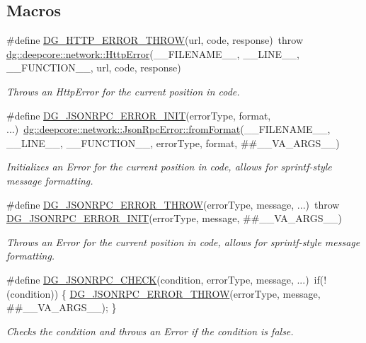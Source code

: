 \subsection*{Macros}
\begin{DoxyCompactItemize}
\item 
\#define \hyperlink{group___network_module_gaa6c6ffb478681996c90ec197922be05f}{D\+G\+\_\+\+H\+T\+T\+P\+\_\+\+E\+R\+R\+O\+R\+\_\+\+T\+H\+R\+OW}(url,  code,  response)~throw \hyperlink{classdg_1_1deepcore_1_1network_1_1_http_error}{dg\+::deepcore\+::network\+::\+Http\+Error}(\+\_\+\+\_\+\+F\+I\+L\+E\+N\+A\+M\+E\+\_\+\+\_\+, \+\_\+\+\_\+\+L\+I\+N\+E\+\_\+\+\_\+, \+\_\+\+\_\+\+F\+U\+N\+C\+T\+I\+O\+N\+\_\+\+\_\+, url, code, response)
\begin{DoxyCompactList}\small\item\em Throws an Http\+Error for the current position in code. \end{DoxyCompactList}\item 
\#define \hyperlink{group___network_module_gaedbbda4a9f7172a69859c7cce370f8a9}{D\+G\+\_\+\+J\+S\+O\+N\+R\+P\+C\+\_\+\+E\+R\+R\+O\+R\+\_\+\+I\+N\+IT}(error\+Type,  format, ...)~\hyperlink{group___network_module_ga2fdfe2154c20e91cb5f0205ced658714}{dg\+::deepcore\+::network\+::\+Json\+Rpc\+Error\+::from\+Format}(\+\_\+\+\_\+\+F\+I\+L\+E\+N\+A\+M\+E\+\_\+\+\_\+, \+\_\+\+\_\+\+L\+I\+N\+E\+\_\+\+\_\+, \+\_\+\+\_\+\+F\+U\+N\+C\+T\+I\+O\+N\+\_\+\+\_\+, error\+Type, format, \#\#\+\_\+\+\_\+\+V\+A\+\_\+\+A\+R\+G\+S\+\_\+\+\_\+)
\begin{DoxyCompactList}\small\item\em Initializes an Error for the current position in code, allows for sprintf-\/style message formatting. \end{DoxyCompactList}\item 
\#define \hyperlink{group___network_module_ga4fd4a19ca3579b636b43aaefc2877229}{D\+G\+\_\+\+J\+S\+O\+N\+R\+P\+C\+\_\+\+E\+R\+R\+O\+R\+\_\+\+T\+H\+R\+OW}(error\+Type,  message, ...)~throw \hyperlink{group___network_module_gaedbbda4a9f7172a69859c7cce370f8a9}{D\+G\+\_\+\+J\+S\+O\+N\+R\+P\+C\+\_\+\+E\+R\+R\+O\+R\+\_\+\+I\+N\+IT}(error\+Type, message, \#\#\+\_\+\+\_\+\+V\+A\+\_\+\+A\+R\+G\+S\+\_\+\+\_\+)
\begin{DoxyCompactList}\small\item\em Throws an Error for the current position in code, allows for sprintf-\/style message formatting. \end{DoxyCompactList}\item 
\#define \hyperlink{group___network_module_ga7d14a793969bb086eb3df0a4e2296db0}{D\+G\+\_\+\+J\+S\+O\+N\+R\+P\+C\+\_\+\+C\+H\+E\+CK}(condition,  error\+Type,  message, ...)~if(!(condition)) \{ \hyperlink{group___network_module_ga4fd4a19ca3579b636b43aaefc2877229}{D\+G\+\_\+\+J\+S\+O\+N\+R\+P\+C\+\_\+\+E\+R\+R\+O\+R\+\_\+\+T\+H\+R\+OW}(error\+Type, message, \#\#\+\_\+\+\_\+\+V\+A\+\_\+\+A\+R\+G\+S\+\_\+\+\_\+); \}
\begin{DoxyCompactList}\small\item\em Checks the condition and throws an Error if the condition is false. \end{DoxyCompactList}\end{DoxyCompactItemize}
